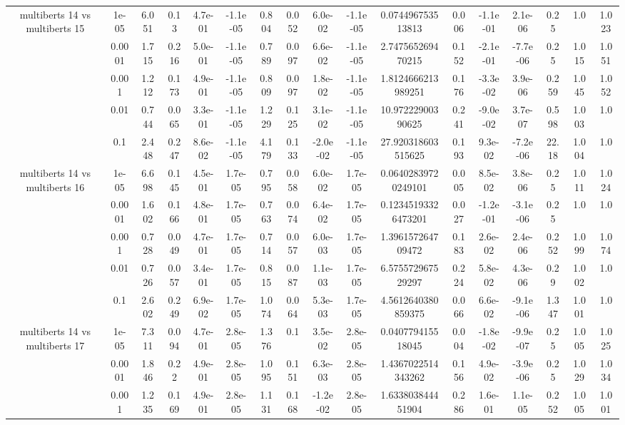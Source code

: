 \begin{tabular}{|c|c|c|c|c|c|c|c|c|c|c|c|c|c|c|c|c|}
\hline
\multirow{5}{*}{multiberts 14 vs multiberts 15} & 1e-05 & 6.051 & 0.13 & 4.7e-01 & -1.1e-05 & 0.804 & 0.052 & 6.0e-02 & -1.1e-05 & 0.074496753513813 & 0.006 & -1.1e-01 & 2.1e-06 & 0.25 & 1.0 & 1.023 \\
 & 0.0001 & 1.715 & 0.216 & 5.0e-01 & -1.1e-05 & 0.789 & 0.097 & 6.6e-02 & -1.1e-05 & 2.747565269470215 & 0.152 & -2.1e-01 & -7.7e-06 & 0.25 & 1.015 & 1.051 \\
 & 0.001 & 1.212 & 0.173 & 4.9e-01 & -1.1e-05 & 0.809 & 0.097 & 1.8e-02 & -1.1e-05 & 1.8124666213989251 & 0.176 & -3.3e-02 & 3.9e-06 & 0.259 & 1.045 & 1.052 \\
 & 0.01 & 0.744 & 0.065 & 3.3e-01 & -1.1e-05 & 1.229 & 0.125 & 3.1e-02 & -1.1e-05 & 10.97222900390625 & 0.241 & -9.0e-02 & 3.7e-07 & 0.598 & 1.003 & 1.0 \\
 & 0.1 & 2.448 & 0.247 & 8.6e-02 & -1.1e-05 & 4.179 & 0.133 & -2.0e-02 & -1.1e-05 & 27.920318603515625 & 0.193 & 9.3e-02 & -7.2e-06 & 22.18 & 1.004 & 1.0 \\
\hline
\multirow{5}{*}{multiberts 14 vs multiberts 16} & 1e-05 & 6.698 & 0.145 & 4.5e-01 & 1.7e-05 & 0.795 & 0.058 & 6.0e-02 & 1.7e-05 & 0.06402839720249101 & 0.005 & 8.5e-02 & 3.8e-06 & 0.25 & 1.011 & 1.024 \\
 & 0.0001 & 1.602 & 0.166 & 4.8e-01 & 1.7e-05 & 0.763 & 0.074 & 6.4e-02 & 1.7e-05 & 0.12345193326473201 & 0.027 & -1.2e-01 & -3.1e-06 & 0.25 & 1.0 & 1.0 \\
 & 0.001 & 0.728 & 0.049 & 4.7e-01 & 1.7e-05 & 0.714 & 0.057 & 6.0e-03 & 1.7e-05 & 1.396157264709472 & 0.183 & 2.6e-02 & 2.4e-06 & 0.252 & 1.099 & 1.074 \\
 & 0.01 & 0.726 & 0.057 & 3.4e-01 & 1.7e-05 & 0.815 & 0.087 & 1.1e-03 & 1.7e-05 & 6.575572967529297 & 0.224 & 5.8e-02 & 4.3e-06 & 0.29 & 1.002 & 1.0 \\
 & 0.1 & 2.602 & 0.249 & 6.9e-02 & 1.7e-05 & 1.074 & 0.064 & 5.3e-03 & 1.7e-05 & 4.5612640380859375 & 0.066 & 6.6e-02 & -9.1e-06 & 1.347 & 1.001 & 1.0 \\
\hline
\multirow{5}{*}{multiberts 14 vs multiberts 17} & 1e-05 & 7.311 & 0.094 & 4.7e-01 & 2.8e-05 & 1.376 & 0.1 & 3.5e-02 & 2.8e-05 & 0.040779415518045 & 0.004 & -1.8e-02 & -9.9e-07 & 0.25 & 1.005 & 1.025 \\
 & 0.0001 & 1.846 & 0.22 & 4.9e-01 & 2.8e-05 & 1.095 & 0.151 & 6.3e-03 & 2.8e-05 & 1.4367022514343262 & 0.156 & 4.9e-02 & -3.9e-06 & 0.25 & 1.029 & 1.034 \\
 & 0.001 & 1.235 & 0.169 & 4.9e-01 & 2.8e-05 & 1.131 & 0.168 & -1.2e-02 & 2.8e-05 & 1.633803844451904 & 0.286 & 1.6e-01 & 1.1e-05 & 0.252 & 1.005 & 1.001 \\

\end{tabular}
